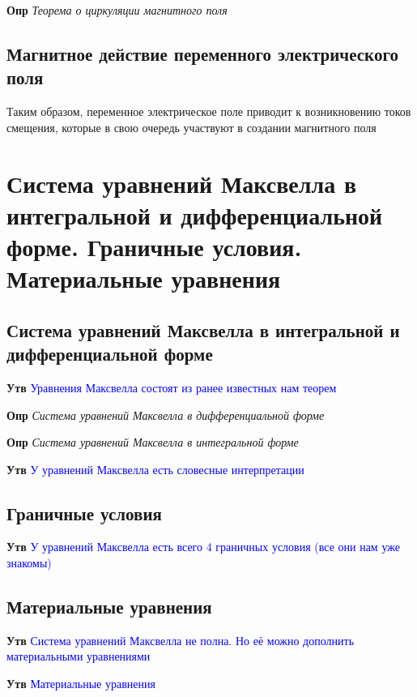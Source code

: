 \documentclass[a4paper, 14pt]{article}
\begin{document}
    \textbf{Опр} \textit{Теорема о циркуляции магнитного поля}
    
    \subsection{Магнитное действие переменного электрического поля}
    
    Таким образом, переменное электрическое поле приводит к возникновению токов смещения, которые в свою очередь
    участвуют в создании магнитного поля
    
    \section{Система уравнений Максвелла в интегральной и дифференциальной форме.
    Граничные условия.
    Материальные уравнения}
    
    \subsection{Система уравнений Максвелла в интегральной и дифференциальной форме}
    
    \textbf{Утв} \textcolor{blue}{Уравнения Максвелла состоят из ранее известных нам теорем}
    
    \textbf{Опр} \textit{Система уравнений Максвелла в дифференциальной форме}
    
    \textbf{Опр} \textit{Система уравнений Максвелла в интегральной форме}
    
    \textbf{Утв} \textcolor{blue}{У уравнений Максвелла есть словесные интерпретации}
    
    \subsection{Граничные условия}
    
    \textbf{Утв} \textcolor{blue}{У уравнений Максвелла есть всего 4 граничных условия (все они нам уже знакомы)}
    
    \subsection{Материальные уравнения}
    
    \textbf{Утв} \textcolor{blue}{Система уравнений Максвелла не полна.
    Но её можно дополнить материальными уравнениями}
    
    \textbf{Утв} \textcolor{blue}{Материальные уравнения}
    
\end{document}
